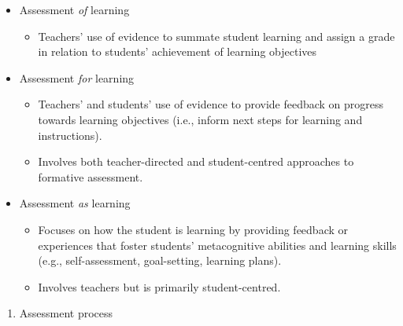 \documentclass[
]{book}
\providecommand{\tightlist}{%
  \setlength{\itemsep}{0pt}\setlength{\parskip}{0pt}}
\begin{document}
\begin{itemize}
\tightlist
\item
  Assessment \emph{of} learning

  \begin{itemize}
  \tightlist
  \item
    Teachers' use of evidence to summate student learning and assign a grade in relation to students' achievement of learning objectives\\
  \end{itemize}
\item
  Assessment \emph{for} learning

  \begin{itemize}
  \tightlist
  \item
    Teachers' and students' use of evidence to provide feedback on progress towards learning objectives (i.e., inform next steps for learning and instructions).\\
  \item
    Involves both teacher-directed and student-centred approaches to formative assessment.\\
  \end{itemize}
\item
  Assessment \emph{as} learning

  \begin{itemize}
  \tightlist
  \item
    Focuses on how the student is learning by providing feedback or experiences that foster students' metacognitive abilities and learning skills (e.g., self-assessment, goal-setting, learning plans).\\
  \item
    Involves teachers but is primarily student-centred.\\
  \end{itemize}
\end{itemize}

\begin{enumerate}
\def\labelenumi{\arabic{enumi}.}
\setcounter{enumi}{1}
\tightlist
\item
  Assessment process\\
\end{enumerate}
\end{document}
